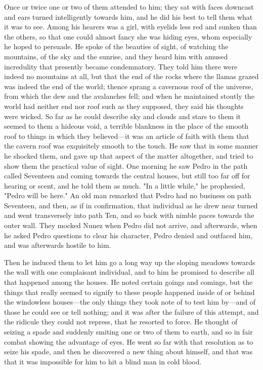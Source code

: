 \documentclass[submission]{sffms}
\begin{document}
Once or twice one or two of them attended to him; they sat with faces
downcast and ears turned intelligently towards him, and he did his
best to tell them what it was to see. Among his hearers was a girl,
with eyelids less red and sunken than the others, so that one could
almost fancy she was hiding eyes, whom especially he hoped to
persuade. He spoke of the beauties of sight, of watching the
mountains, of the sky and the sunrise, and they heard him with amused
incredulity that presently became condemnatory. They told him there
were indeed no mountains at all, but that the end of the rocks where
the llamas grazed was indeed the end of the world; thence sprang a
cavernous roof of the universe, from which the dew and the avalanches
fell; and when he maintained stoutly the world had neither end nor
roof such as they supposed, they said his thoughts were wicked. So far
as he could describe sky and clouds and stars to them it seemed to
them a hideous void, a terrible blankness in the place of the smooth
roof to things in which they believed---it was an article of faith with
them that the cavern roof was exquisitely smooth to the touch. He saw
that in some manner he shocked them, and gave up that aspect of the
matter altogether, and tried to show them the practical value of
sight. One morning he saw Pedro in the path called Seventeen and
coming towards the central houses, but still too far off for hearing
or scent, and he told them as much. "In a little while," he
prophesied, "Pedro will be here." An old man remarked that Pedro had
no business on path Seventeen, and then, as if in confirmation, that
individual as he drew near turned and went transversely into path Ten,
and so back with nimble paces towards the outer wall. They mocked
Nunez when Pedro did not arrive, and afterwards, when he asked Pedro
questions to clear his character, Pedro denied and outfaced him, and
was afterwards hostile to him.

Then he induced them to let him go a long way up the sloping meadows
towards the wall with one complaisant individual, and to him he
promised to describe all that happened among the houses. He noted
certain goings and comings, but the things that really seemed to
signify to these people happened inside of or behind the windowless
houses---the only things they took note of to test him by---and of those
he could see or tell nothing; and it was after the failure of this
attempt, and the ridicule they could not repress, that he resorted to
force. He thought of seizing a spade and suddenly smiting one or two
of them to earth, and so in fair combat showing the advantage of
eyes. He went so far with that resolution as to seize his spade, and
then he discovered a new thing about himself, and that was that it was
impossible for him to hit a blind man in cold blood.
\end{document}
